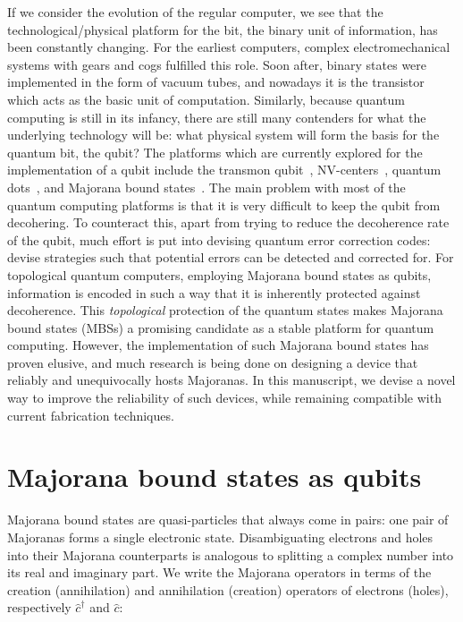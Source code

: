 	If we consider the evolution of the regular computer, we see that the technological/physical platform for the bit, the binary unit of information, has been constantly changing.
	For the earliest computers, complex electromechanical systems with gears and cogs fulfilled this role.
	Soon after, binary states were implemented in the form of vacuum tubes, and nowadays it is the transistor which acts as the basic unit of computation.
	Similarly, because quantum computing is still in its infancy, there are still many contenders for what the underlying technology will be: what physical system will form the basis for the quantum bit, the qubit?
	The platforms which are currently explored for the implementation of a qubit include the transmon qubit~\cite{wendin_quantum_2017}, NV-centers~\cite{childress_diamond_2013}, quantum dots~\cite{kloeffel_prospects_2013}, and Majorana bound states~\cite{wendin_quantum_2017}.
	The main problem with most of the quantum computing platforms is that it is very difficult to keep the qubit from decohering.
	To counteract this, apart from trying to reduce the decoherence rate of the qubit, much effort is put into devising quantum error correction codes: devise strategies such that potential errors can be detected and corrected for.
	For topological quantum computers, employing Majorana bound states as qubits, information is encoded in such a way that it is inherently protected against decoherence.
	This \emph{topological} protection of the quantum states makes Majorana bound states (MBSs) a promising candidate as a stable platform for quantum computing.
	However, the implementation of such Majorana bound states has proven elusive, and much research is being done on designing a device that reliably and unequivocally hosts Majoranas.
	In this manuscript, we devise a novel way to improve the reliability of such devices, while remaining compatible with current fabrication techniques.

\section{Majorana bound states as qubits}

	Majorana bound states are quasi-particles that always come in pairs: one pair of Majoranas forms a single electronic state.
	Disambiguating electrons and holes into their Majorana counterparts is analogous to splitting a complex number into its real and imaginary part.
	We write the Majorana operators in terms of the creation (annihilation) and annihilation (creation) operators of electrons (holes), respectively $\hat{c}^\dagger$ and $\hat{c}$:

